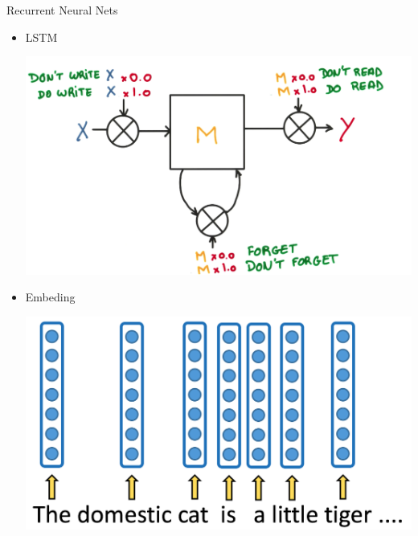 \documentclass{beamer}
\begin{document}
\begin{frame}{Recurrent Neural Nets}
	\begin{itemize}
		  \item LSTM
		
		\begin{center}
			  \includegraphics[scale=0.15]{img/lstm2}
		\end{center}
		
		  \item Embeding
		\begin{center}
			  \includegraphics[scale=0.15]{img/text_repr.png}
		\end{center}
	\end{itemize}
\end{frame}
\end{document}
